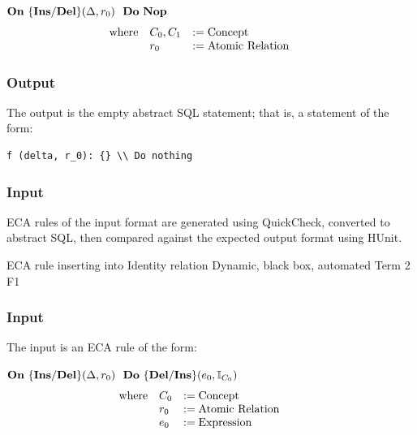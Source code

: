 \documentclass[12pt]{report}
\begin{document}
$\mathbf{On~} \mathbf{\{Ins/Del\}}(\Delta,r_0) \,\,\,\,\mathbf{Do~} \mathbf{Nop~} $
\vspace{-10pt}\[\hspace{-20pt}\begin{array}{lll}
\text{where} & C_0, C_1 & := \text{Concept} \\ 
             & r_0      & := \text{Atomic Relation} \\ 
\end{array}\]

\vspace{-12pt}\subsubsection*{Output}

The output is the empty abstract SQL statement; that is, a statement of the form:
\begin{verbatim}
f (delta, r_0): {} \\ Do nothing
\end{verbatim}

\vspace{-12pt}\subsubsection*{Input}

ECA rules of the input format are generated using QuickCheck, converted to
  abstract SQL, then compared against the expected output format using HUnit.


{ECA rule inserting into Identity relation} 
{Dynamic, black box, automated}  
{Term 2}
{F1}
\vspace{-12pt}\subsubsection*{Input}
The input is an ECA rule of the form:

$\mathbf{On~} \mathbf{\{Ins/Del\}}(\Delta,r_0) \,\,\,\,\mathbf{Do~} \mathbf{\{Del/Ins\}}(e_0,\mathbb{I}_{C_0}) $
\vspace{-10pt}\[\hspace{-20pt}\begin{array}{lll}
\text{where} & C_0 & := \text{Concept} \\ 
             & r_0 & := \text{Atomic Relation}\\ 
             & e_0 & := \text{Expression}\\ 
\end{array}\]
\end{document}

